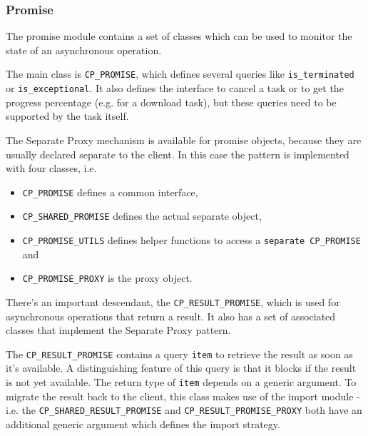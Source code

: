 \documentclass[a4paper,10pt]{article}
\begin{document}
% 

\subsubsection{Promise}
\label {sec:promise}

The promise module contains a set of classes which can be used to monitor the state of an asynchronous operation.

The main class is \lstinline!CP_PROMISE!, which defines several queries like \lstinline!is_terminated! or \lstinline!is_exceptional!.
It also defines the interface to cancel a task or to get the progress percentage (e.g. for a download task), but these queries need to be supported by the task itself.

The Separate Proxy mechanism is available for promise objects, because they are usually declared separate to the client.
In this case the pattern is implemented with four classes, i.e.
\begin{itemize}
 \item \lstinline!CP_PROMISE! defines a common interface,
 \item \lstinline!CP_SHARED_PROMISE! defines the actual separate object,
 \item \lstinline!CP_PROMISE_UTILS! defines helper functions to access a \lstinline!separate CP_PROMISE! and
 \item \lstinline!CP_PROMISE_PROXY! is the proxy object.
\end{itemize}

There's an important descendant, the \lstinline!CP_RESULT_PROMISE!, which is used for asynchronous operations that return a result.
It also has a set of associated classes that implement the Separate Proxy pattern.

The \lstinline!CP_RESULT_PROMISE! contains a query \lstinline!item! to retrieve the result as soon as it's available.
A distinguishing feature of this query is that it blocks if the result is not yet available.
The return type of \lstinline!item! depends on a generic argument.
To migrate the result back to the client, this class makes use of the import module - i.e. the \lstinline!CP_SHARED_RESULT_PROMISE! and \lstinline!CP_RESULT_PROMISE_PROXY! both have an additional generic argument which defines the import strategy.
\end{document}
